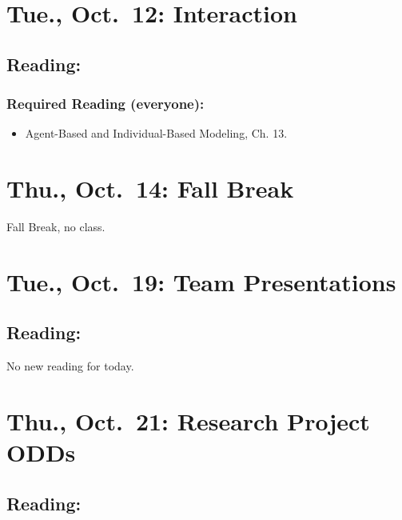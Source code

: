 \documentclass[
]{article}
\providecommand{\tightlist}{%
  \setlength{\itemsep}{0pt}\setlength{\parskip}{0pt}}
\begin{document}
\hypertarget{tue.-oct.-12-interaction}{%
\section{Tue., Oct.~12: Interaction}\label{tue.-oct.-12-interaction}}

\hypertarget{reading-13}{%
\subsection{Reading:}\label{reading-13}}

\hypertarget{required-reading-everyone-12}{%
\subsubsection{Required Reading
(everyone):}\label{required-reading-everyone-12}}

\begin{itemize}
\tightlist
\item
  Agent-Based and Individual-Based Modeling, Ch. 13.
\end{itemize}

\hypertarget{thu.-oct.-14-fall-break}{%
\section{Thu., Oct.~14: Fall Break}\label{thu.-oct.-14-fall-break}}

Fall Break, no class.

\hypertarget{tue.-oct.-19-team-presentations}{%
\section{Tue., Oct.~19: Team
Presentations}\label{tue.-oct.-19-team-presentations}}

\hypertarget{reading-14}{%
\subsection{Reading:}\label{reading-14}}

No new reading for today.

\hypertarget{thu.-oct.-21-research-project-odds}{%
\section{Thu., Oct.~21: Research Project
ODDs}\label{thu.-oct.-21-research-project-odds}}

\hypertarget{reading-15}{%
\subsection{Reading:}\label{reading-15}}
\end{document}
